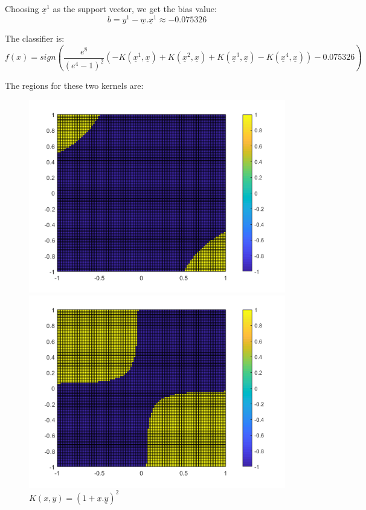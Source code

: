 \documentclass[letter, 12pt]{article}
\begin{document}
\begin{enumerate}
\begin{itemize}
    		\par{Choosing $ \underline{x}^1 $ as the support vector, we get the bias value:}
    		\[ b = y^1 - \underline{w}.\underline{x}^1 \approx -0.075326 \]
    		\par{The classifier is:}
    		\[ f(x) = sign(\frac{e^8}{(e^4 - 1)^2}(-K(\underline{x}^1, \underline{x}) + K(\underline{x}^2, \underline{x}) + K(\underline{x}^3, \underline{x}) - K(\underline{x}^4, \underline{x})) -0.075326) \]
    	\end{itemize}
    	\par{The regions for these two kernels are:}
    	\begin{figure}[H]
    		\begin{minipage}[b]{.49\textwidth}
    			\includegraphics[width=\textwidth]{fig1.png}
    			\caption{$ K(x, y) = (1 + \underline{x}.\underline{y})^ 2 $}
    			\label{fig1}
    		\end{minipage}
	    	\begin{minipage}[b]{.49\textwidth}
		    	\includegraphics[width=\textwidth]{fig2.png}

\end{minipage}
\end{figure}
\end{enumerate}
\end{document}
